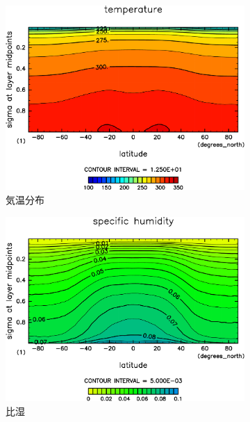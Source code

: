 \documentclass[body]{subfiles}
\begin{document}
\begin{figure}[t]
\begin{subfigure}{.4\textwidth}
		\includegraphics[width=\columnwidth]{S2000/Temp,time=7300:7665-crop-rotate.pdf}
		\caption{気温分布}
	\end{subfigure}
	\begin{subfigure}{.4\textwidth}
		\centering
		\includegraphics[width=\columnwidth]{S2000/QH2OVap,time=7300:7665-crop-rotate.pdf}
		\caption{比湿}
	\end{subfigure}
	\begin{subfigure}{.4\textwidth}
		\centering

\end{subfigure}
\end{figure}
\end{document}
